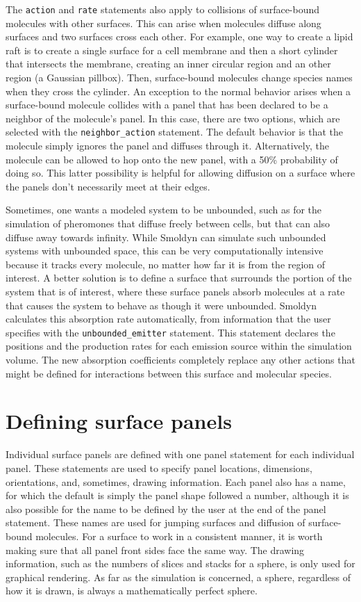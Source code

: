 \documentclass {scrbook}
\newcommand {\ttt} {\texttt}
\begin{document}
The \ttt{action} and \ttt{rate} statements also apply to collisions of surface-bound molecules with other surfaces. This can arise when molecules diffuse along surfaces and two surfaces cross each other. For example, one way to create a lipid raft is to create a single surface for a cell membrane and then a short cylinder that intersects the membrane, creating an inner circular region and an other region (a Gaussian pillbox). Then, surface-bound molecules change species names when they cross the cylinder. An exception to the normal behavior arises when a surface-bound molecule collides with a panel that has been declared to be a neighbor of the molecule's panel. In this case, there are two options, which are selected with the \ttt{neighbor\_action} statement. The default behavior is that the molecule simply ignores the panel and diffuses through it. Alternatively, the molecule can be allowed to hop onto the new panel, with a 50\% probability of doing so. This latter possibility is helpful for allowing diffusion on a surface where the panels don't necessarily meet at their edges.

Sometimes, one wants a modeled system to be unbounded, such as for the simulation of pheromones that diffuse freely between cells, but that can also diffuse away towards infinity. While Smoldyn can simulate such unbounded systems with unbounded space, this can be very computationally intensive because it tracks every molecule, no matter how far it is from the region of interest. A better solution is to define a surface that surrounds the portion of the system that is of interest, where these surface panels absorb molecules at a rate that causes the system to behave as though it were unbounded. Smoldyn calculates this absorption rate automatically, from information that the user specifies with the \ttt{unbounded\_emitter} statement. This statement declares the positions and the production rates for each emission source within the simulation volume. The new absorption coefficients completely replace any other actions that might be defined for interactions between this surface and molecular species.

\section{Defining surface panels}

Individual surface panels are defined with one panel statement for each individual panel. These statements are used to specify panel locations, dimensions, orientations, and, sometimes, drawing information. Each panel also has a name, for which the default is simply the panel shape followed a number, although it is also possible for the name to be defined by the user at the end of the panel statement. These names are used for jumping surfaces and diffusion of surface-bound molecules. For a surface to work in a consistent manner, it is worth making sure that all panel front sides face the same way. The drawing information, such as the numbers of slices and stacks for a sphere, is only used for graphical rendering. As far as the simulation is concerned, a sphere, regardless of how it is drawn, is always a mathematically perfect sphere.
\end{document}
